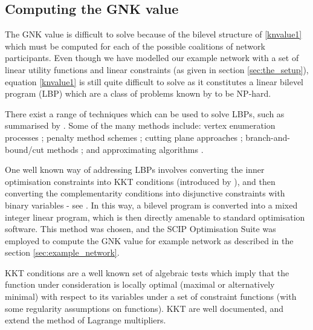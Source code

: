 \subsection{Computing the GNK value}\label{subsec:gnk_compute1}

The GNK value is difficult to solve because of the bilevel structure of \eqref{knvalue1} which must be computed for each of the possible coalitions of network participants.
Even though we have modelled our example network with a set of linear utility functions and linear constraints (as given in section \ref{sec:the_setup}), equation \eqref{knvalue1} is still quite difficult to solve as it constitutes a linear bilevel program (LBP) which are a class of problems known by to be NP-hard. \citep{DBLP:journals/tec/SinhaMD18,Ben-Ayed:1990:CDB} 

There exist a range of techniques which can be used to solve LBPs, such as summarised by \cite{DBLP:journals/tec/SinhaMD18,S.Dempe.Optimisations}.
Some of the many methods include: vertex enumeration processes \citep{Bialas:1984:TLP:2784019.2784026,Shi:2005:EKA:2641854.2642183,LIU1995644}; penalty method schemes \citep{KleinertSchmidt2019,ONAL1993126,dempe_optimisation111};
cutting plane approaches \citep{cuttingplane1};
branch-and-bound/cut methods \citep{SHI200551,Hansen:1992:NBR:141164.141181,Audet2007};
and approximating algorithms \citep{Pineda2018,rnnlbp1,genetic_algirthm_blp}.

One well known way of addressing LBPs involves converting the inner optimisation constraints into KKT conditions (introduced by \cite{kuhn1951nonlinear}), and then converting the complementarity conditions into disjunctive constraints with binary variables - see \cite{Fortuny-Amat1981,Pineda2018}.
In this way, a bilevel program is converted into a mixed integer linear program, which is then directly amenable to standard optimisation software.
This method was chosen, and the SCIP Optimisation Suite was employed to compute the GNK value for \DIFdelbegin {}\DIFdelend \DIFaddbegin {}\DIFaddend example network as described in the \DIFdelbegin {}\DIFdelend \DIFaddbegin {}\DIFaddend section \ref{sec:example_network}.

KKT conditions are a well known set of algebraic tests which imply that the function under consideration is locally optimal (maximal or alternatively minimal) with respect to its variables under a set of constraint functions (with some regularity assumptions on \DIFdelbegin {}\DIFdelend \DIFaddbegin {}\DIFaddend functions).
KKT are well documented, and extend the method of Lagrange multipliers.

